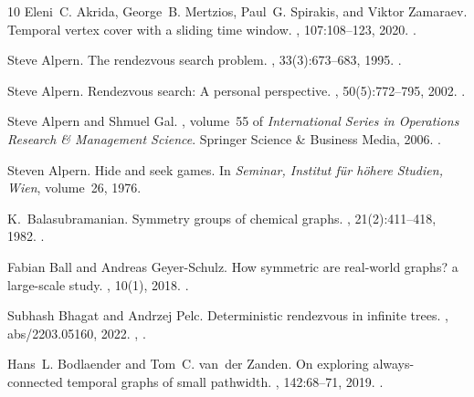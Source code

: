 \documentclass[10pt,a4paper]{article}
\begin{document}
\begin{thebibliography}{10}
Eleni~C. Akrida, George~B. Mertzios, Paul~G. Spirakis, and Viktor Zamaraev.
\newblock Temporal vertex cover with a sliding time window.
, 107:108--123, 2020.
\newblock \href {https://doi.org/10.1016/j.jcss.2019.08.002}
  {}.

Steve Alpern.
\newblock The rendezvous search problem.
, 33(3):673--683, 1995.
\newblock \href {https://doi.org/10.1137/S0363012993249195}
  {}.

Steve Alpern.
\newblock Rendezvous search: A personal perspective.
, 50(5):772--795, 2002.
\newblock \href {https://doi.org/10.1287/opre.50.5.772.363}
  {}.

Steve Alpern and Shmuel Gal.
, volume~55 of {\em
  International Series in Operations Research \& Management Science}.
\newblock Springer Science \& Business Media, 2006.
\newblock \href {https://doi.org/10.1007/b100809} {}.

Steven Alpern.
\newblock Hide and seek games.
\newblock In {\em Seminar, Institut f{\"u}r h{\"o}here Studien, Wien},
  volume~26, 1976.

K.~Balasubramanian.
\newblock Symmetry groups of chemical graphs.
, 21(2):411--418,
  1982.
\newblock \href {https://doi.org/10.1002/qua.560210206}
  {}.

Fabian Ball and Andreas Geyer-Schulz.
\newblock How symmetric are real-world graphs? a large-scale study.
, 10(1), 2018.
\newblock \href {https://doi.org/10.3390/sym10010029}
  {}.

Subhash Bhagat and Andrzej Pelc.
\newblock Deterministic rendezvous in infinite trees.
, abs/2203.05160, 2022.
\newblock \href {http://arxiv.org/abs/2203.05160} {},
  \href {https://doi.org/10.48550/arXiv.2203.05160}
  {}.

Hans~L. Bodlaender and Tom~C. van~der Zanden.
\newblock On exploring always-connected temporal graphs of small pathwidth.
, 142:68--71, 2019.
\newblock \href {https://doi.org/10.1016/j.ipl.2018.10.016}
  {}.


\end{thebibliography}
\end{document}
